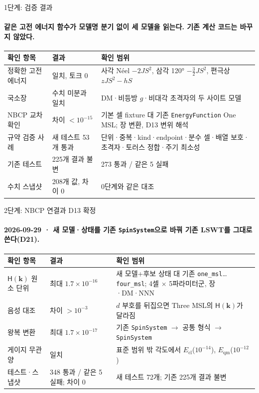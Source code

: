 \begin{frame}[label=stage1-verification]{1단계: 검증 결과}
  \framesubtitle{같은 고전 에너지 함수가 모델명 분기 없이 세 모델을 읽는다. 기존 계산 코드는 바꾸지 않았다.}
  \small
  \begin{tabularx}{\textwidth}{@{}p{3.6cm}p{3.3cm}Y@{}}
    \toprule
    확인 항목 & 결과 & 확인 범위 \\
    \midrule
    정확한 고전 에너지 & 일치, 토크 0 & 사각 Néel $-2JS^2$, 삼각 120° $-\tfrac32JS^2$, 편극상 $zJS^2-hS$ \\
    국소장 & 수치 미분과 일치 & DM·비등방 $g$·비대각 초격자의 두 사이트 모델 \\
    NBCP 교차 확인 & 차이 $<10^{-15}$ & 기본 셀 fixture 대 기존 \texttt{EnergyFunction} One MSL; 장 변환, D13 변위 해석 \\
    규약 검증 사례 & 새 테스트 53개 통과 & 단위·중복·kind·endpoint·분수 셀·배열 보호·초격자·토러스 정합·주기 최소성 \\
    기존 테스트 & 225개 결과 불변 & 273 통과 / 같은 5 실패 \\
    수치 스냅샷 & 208개 값, 차이 0 & 0단계와 같은 대조 \\
    \bottomrule
  \end{tabularx}
  \par\medskip
\end{frame}

\begin{frame}[label=stage2-verification]{2단계: NBCP 연결과 D13 확정}
  \framesubtitle{2026-09-29 · 새 모델·상태를 기존 \texttt{SpinSystem}으로 바꿔 기존 LSWT를 그대로 쓴다(D21).}
  \small
  \begin{tabularx}{\textwidth}{@{}p{3.4cm}p{3.3cm}Y@{}}
    \toprule
    확인 항목 & 결과 & 확인 범위 \\
    \midrule
    $\mathsf H(\mathbf k)$ 원소 단위 & 최대 $1.7\times10^{-16}$ & 새 모델+후보 상태 대 기존 \texttt{one\_msl}…\texttt{four\_msl}; 4셀 $\times$ 5파라미터군, 장·DM·NNN \\
    음성 대조 & 차이 $>10^{-3}$ & $d$ 부호를 뒤집으면 Three MSL의 $\mathsf H(\mathbf k)$가 달라짐 \\
    왕복 변환 & 최대 $1.7\times10^{-17}$ & 기존 \texttt{SpinSystem} $\to$ 공통 형식 $\to$ \texttt{SpinSystem} \\
    게이지 무관 양 & 일치 & 표준 범위 밖 각도에서 $E_{\mathrm{cl}}$($10^{-14}$), $E_{\mathrm{qm}}$($10^{-12}$) \\
    테스트·스냅샷 & 348 통과 / 같은 5 실패; 차이 0 & 새 테스트 72개; 기존 225개 결과 불변 \\
    \bottomrule
  \end{tabularx}
  \par\medskip
\end{frame}

